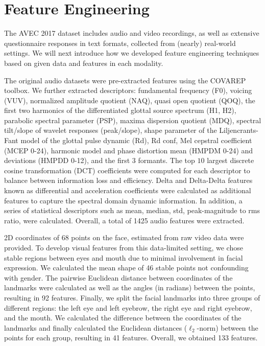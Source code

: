 \documentclass[letterpaper]{article} %
\begin{document}
\section{Feature Engineering}

The AVEC 2017 dataset includes audio and video recordings, as well as extensive questionnaire responses in text formats, collected from (nearly) real-world settings. We will next introduce how we developed feature engineering techniques based on given data and features in each modality.

The original audio datasets were pre-extracted features using the COVAREP toolbox.  We further extracted descriptors: fundamental frequency (F0), voicing (VUV), normalized amplitude quotient (NAQ), quasi open quotient (QOQ), the first two harmonics of the differentiated glottal source spectrum (H1, H2), parabolic spectral parameter (PSP), maxima dispersion quotient (MDQ), spectral tilt/slope of wavelet responses (peak/slope), shape parameter of the Liljencrants-Fant model of the glottal pulse dynamic (Rd), Rd conf, Mel cepstral coefficient (MCEP 0-24), harmonic model and phase distortion mean (HMPDM 0-24) and deviations (HMPDD 0-12), and the first 3 formants. The top $10$ largest discrete cosine transformation (DCT) coefficients were computed for each descriptor to balance between information loss and efficiency. Delta and Delta-Delta features known as differential and acceleration coefficients were calculated as additional features to capture the spectral domain dynamic information. In addition, a series of statistical descriptors such as mean, median, std, peak-magnitude to rms ratio, were calculated. Overall, a total of 1425 audio features were extracted.

2D coordinates of 68 points on the face, estimated from raw video data were provided. To develop visual features from this data-limited setting, we chose stable regions between eyes and mouth due to minimal involvement in facial expression. We calculated the mean shape of 46 stable points not confounding with gender. The pairwise Euclidean distance between coordinates of the landmarks were calculated as well as the angles (in radians) between the points, resulting in 92 features. Finally, we split the facial landmarks into three groups of different regions: the left eye and left eyebrow, the right eye and right eyebrow, and the mouth. We calculated the difference between the coordinates of the landmarks and finally calculated the Euclidean distances ($\ell_2$-norm) between the points for each group, resulting in 41 features. Overall, we obtained 133 features.
\end{document}
